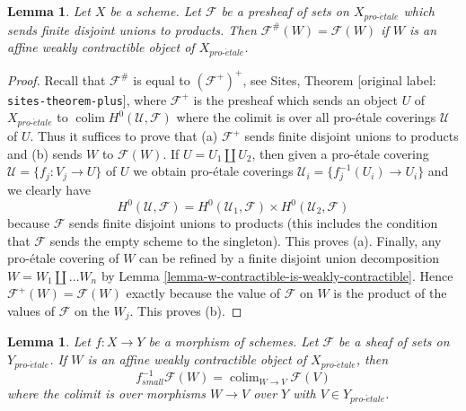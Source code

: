 \documentclass[10pt,a4paper]{article}
\theoremstyle{plain}
\newtheorem{lemma}[subsection]{Lemma}
\theoremstyle{definition}
\theoremstyle{remark}
\numberwithin{equation}{subsection}
\def\colim{\mathop{\mathrm{colim}}\nolimits}
\def\proetale{{pro\text{-}\acute{e}tale}}
\begin{document}
\begin{lemma}
\label{lemma-presheaf-value-weakly-contractible}
Let $X$ be a scheme. Let $\mathcal{F}$ be a presheaf of sets on $X_\proetale$
which sends finite disjoint unions to products. Then
$\mathcal{F}^\#(W) = \mathcal{F}(W)$ if $W$ is an affine weakly contractible
object of $X_\proetale$.
\end{lemma}

\begin{proof}
Recall that $\mathcal{F}^\#$ is equal to $(\mathcal{F}^+)^+$, see
Sites, Theorem \textnormal{[original label: \nolinkurl{sites-theorem-plus}]}, where $\mathcal{F}^+$
is the presheaf which sends an object $U$ of $X_\proetale$ to
$\colim H^0(\mathcal{U}, \mathcal{F})$ where the colimit is
over all pro-\'etale coverings $\mathcal{U}$ of $U$.
Thus it suffices to prove that (a) $\mathcal{F}^+$ sends finite
disjoint unions to products and (b) sends $W$ to $\mathcal{F}(W)$.
If $U = U_1 \amalg U_2$, then given a pro-\'etale covering
$\mathcal{U} = \{f_j : V_j \to U\}$ of $U$ we obtain pro-\'etale coverings
$\mathcal{U}_i = \{f_j^{-1}(U_i) \to U_i\}$ and we clearly have
$$
H^0(\mathcal{U}, \mathcal{F}) =
H^0(\mathcal{U}_1, \mathcal{F}) \times
H^0(\mathcal{U}_2, \mathcal{F})
$$
because $\mathcal{F}$ sends finite disjoint unions to products (this includes
the condition that $\mathcal{F}$ sends the empty scheme to the singleton).
This proves (a).
Finally, any pro-\'etale covering of $W$ can be refined by a finite disjoint
union decomposition $W = W_1 \amalg \ldots W_n$ by
Lemma \ref{lemma-w-contractible-is-weakly-contractible}.
Hence $\mathcal{F}^+(W) = \mathcal{F}(W)$ exactly because the value of
$\mathcal{F}$ on $W$ is the product of the values of $\mathcal{F}$
on the $W_j$. This proves (b).
\end{proof}

\begin{lemma}
\label{lemma-small-pullback-weakly-contractible}
Let $f : X \to Y$ be a morphism of schemes. Let $\mathcal{F}$ be a sheaf
of sets on $Y_\proetale$. If $W$ is an affine weakly contractible
object of $X_\proetale$, then
$$
f_{small}^{-1}\mathcal{F}(W) = \colim_{W \to V} \mathcal{F}(V)
$$
where the colimit is over morphisms $W \to V$ over $Y$
with $V \in Y_\proetale$.
\end{lemma}
\end{document}

